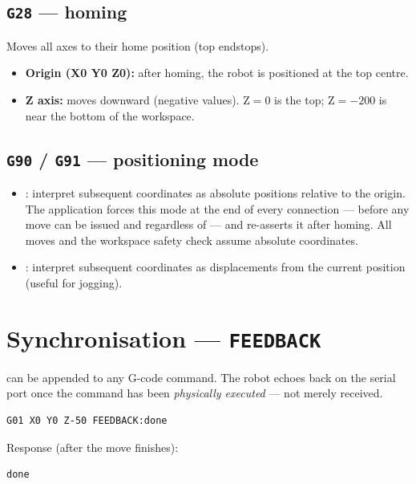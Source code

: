 \subsection{\texttt{G28} --- homing}
%
Moves all axes to their home position (top endstops).
\begin{itemize}
  \item \textbf{Origin (X0 Y0 Z0):} after homing, the robot is positioned
    at the top centre.
  \item \textbf{Z axis:} moves downward (negative values). Z$=0$ is the
    top; Z$=-200$ is near the bottom of the workspace.
\end{itemize}

\subsection{\texttt{G90} / \texttt{G91} --- positioning mode}
%
\begin{itemize}
  \item {}: interpret subsequent coordinates as absolute positions
    relative to the origin. The application forces this mode at the end of
    every connection --- before any move can be issued and regardless of
     --- and re-asserts it after homing. All
     moves and the workspace safety check assume absolute
    coordinates.
  \item {}: interpret subsequent coordinates as displacements from
    the current position (useful for jogging).
\end{itemize}

\section{Synchronisation --- \texttt{FEEDBACK}}
\label{sec:gcode-feedback}
%
 can be appended to any G-code command. The robot
echoes  back on the serial port once the command has been
\emph{physically executed} --- not merely received.

\begin{lstlisting}
G01 X0 Y0 Z-50 FEEDBACK:done
\end{lstlisting}
Response (after the move finishes):
\begin{lstlisting}
done
\end{lstlisting}


